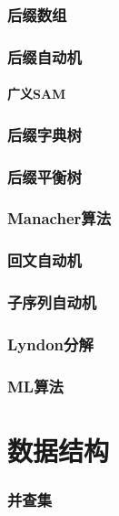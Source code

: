 \documentclass[12pt,a4paper]{article}
\begin{document}
\newpage
\section{后缀数组} %

\newpage
\section{后缀自动机}
\subsection{广义SAM}

\newpage
\section{后缀字典树}

\newpage
\section{后缀平衡树}

\newpage
\section{Manacher算法}

\newpage
\section{回文自动机} %

\newpage
\section{子序列自动机}

\newpage
\section{Lyndon分解} %

\newpage
\section{ML算法}

\newpage
\part{数据结构} %
\section{并查集}
\end{document}
